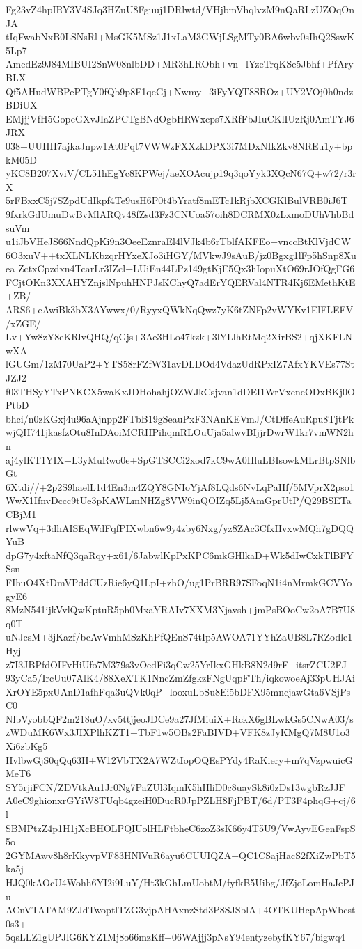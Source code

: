 Fg23vZ4hpIRY3V4SJq3HZuU8Fguuj1DRlwtd/VHjbmVhqlvzM9nQaRLzUZOqOnJA
tIqFwabNxB0LSNsRl+MsGK5MSz1J1xLaM3GWjLSgMTy0BA6wbv0sIhQ2SswK5Lp7
AmedEz9J84MIBUI2SnW08nlbDD+MR3hLRObh+vn+lYzeTrqKSe5Jbhf+PfAryBLX
Qf5AHudWBPePTgY0fQb9p8F1qeGj+Nwmy+3iFyYQT8SROz+UY2VOj0h0ndzBDiUX
EMjjjVfH5GopeGXvJIaZPCTgBNdOgbHRWxcps7XRfFbJIuCKlIUzRj0AmTYJ6JRX
038+UUHH7ajkaJnpw1At0Pqt7VWWzFXXzkDPX3i7MDxNIkZkv8NREu1y+bpkM05D
yKC8B207XviV/CL51hEgYc8KPWej/aeXOAcujp19q3qoYyk3XQcN67Q+w72/r3rX
5rFBxxC5j7SZpdUdIkpf4Te9usH6P0t4bYratf8mETc1kRjbXCGKlBulVRB0iJ6T
9fxrkGdUmuDwBvMlARQv48fZsd3Fz3CNUoa57oih8DCRMX0zLxmoDUhVhbBdsuVm
u1iJbVHeJS66NndQpKi9n3OeeEznraEl4lVJk4b6rTblfAKFEo+vnccBtKlVjdCW
6O3xuV++txXLNLKbzqrHYxeXJo3iHGY/MVkwJ9sAuB/jz0Bgxg1lFp5hSnp8Xuea
ZctxCpzdxn4TcarLr3IZcl+LUiEn44LPz149gtKjE5Qx3hIopuXtO69rJOfQgFG6
FCjtOKn3XXAHYZnjslNpuhHNPJsKChyQ7adErYQERVal4NTR4Kj6EMethKtE+ZB/
ARS6+eAwiBk3bX3AYwwx/0/RyyxQWkNqQwz7yK6tZNFp2vWYKv1ElFLEFV/xZGE/
Lv+Yw8zY8eKRlvQHQ/qGjs+3Ae3HLo47kzk+3lYLlhRtMq2XirBS2+qjXKFLNwXA
lGUGm/1zM70UaP2+YTS58rFZfW31avDLDOd4VdazUdRPxIZ7AfxYKVEs77StJZJ2
f03THSyYTxPNKCX5waKxJDHohahjOZWJkCsjvan1dDEI1WrVxeneODxBKj0OPtbD
bhci/n0zKGxj4u96aAjnpp2FTbB19gSeauPxF3NAnKEVmJ/CtDffeAuRpu8TjtPk
wjQH741jkasfzOtu8InDAoiMCRHPihqmRLOuUja5alwvBIjjrDwrW1kr7vmWN2hn
aj4ylKT1YIX+L3yMuRwo0e+SpGTSCCi2xod7kC9wA0HluLBIsowkMLrBtpSNlbGt
6Xtdi//+2p2S9haelL1d4En3m4ZQY8GNIoYjAf8LQds6NvLqPaHf/5MVprX2pso1
WwX1IfnvDccc9tUe3pKAWLmNHZg8VW9inQOIZq5Lj5AmGprUtP/Q29BSETaCBjM1
rlwwVq+3dhAISEqWdFqfPIXwbn6w9y4zby6Nxg/yz8ZAc3CfxHvxwMQh7gDQQYuB
dpG7y4xftaNfQ3qaRqy+x61/6JabwlKpPxKPC6mkGHlkaD+Wk5dIwCxkTlBFYSsn
FIhuO4XtDmVPddCUzRie6yQ1LpI+zhO/ug1PrBRR97SFoqN1i4nMrmkGCVYogyE6
8MzN541ijkVvlQwKptuR5ph0MxaYRAIv7XXM3Njavsh+jmPsBOoCw2oA7B7U8q0T
uNJcsM+3jKazf/bcAvVmhMSzKhPfQEnS74tIp5AWOA71YYhZaUB8L7RZodle1Hyj
z7I3JBPfdOIFvHiUfo7M379s3vOedFi3qCw25YrIkxGHkB8N2d9rF+itsrZCU2FJ
93yCa5/IrcUu07AlK4/88XeXTK1NncZmZfgkzFNgUqpFTh/iqkowoeAj33pUHJAi
XrOYE5pxUAnD1afhFqa3uQVk0qP+looxuLbSu8Ei5bDFX95mncjawGta6VSjPsC0
NlbVyobbQF2m218uO/xv5ttjjeoJDCe9a27JfMiuiX+RckX6gBLwkGs5CNwA03/s
zWDuMK6Wx3JIXPlhKZT1+TbF1w5OBs2FaBIVD+VFK8zJyKMgQ7M8U1o3Xi6zbKg5
HvlbwGjS0qQq63H+W12VbTX2A7WZtIopOQEsPYdy4RaKiery+m7qVzpwuicGMeT6
SY5rjiFCN/ZDVtkAu1Jr0Ng7PaZUl3IqmK5hHliD0c8uaySk8i0zDs13wgbRzJJF
A0eC9ghionxrGYiW8TUqb4gzeiH0DucR0JpPZLH8FjPBT/6d/PT3F4phqG+cj/6l
SBMPtzZ4p1H1jXcBHOLPQIUolHLFtbheC6zoZ3sK66y4T5U9/VwAyvEGenFspS5o
2GYMAwv8h8rKkyvpVF83HNlVuR6ayu6CUUIQZA+QC1CSajHacS2fXiZwPbT5ka5j
HJQ0kAOcU4Wohh6YI2i9LuY/Ht3kGhLmUobtM/fyfkB5Uibg/JfZjoLomHaJcPJu
ACnVTATAM9ZJdTwoptlTZG3vjpAHAxnzStd3P8SJSblA+4OTKUHcpApWbcst0s3+
5qsLLZ1gUPJlG6KYZ1Mj8o66mzKff+06WAjjj3pNsY94entyzebyfKY67/bigwq4
